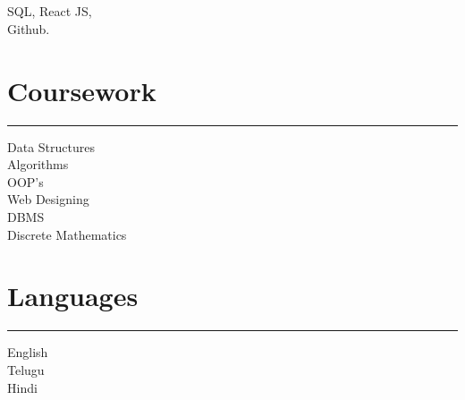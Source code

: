 \documentclass[]{rahulworld-resume}
\begin{document}
\begin{minipage}[t]{0.33\textwidth}
\subsection{}
\vspace{3pt}
SQL, React JS,\\
 Github.\\
\vspace{6pt}

\sectionsep
\section{Coursework}
\noindent\rule{5cm}{0.4pt}

Data Structures\\
Algorithms\\
OOP's\\
Web Designing\\
DBMS\\
Discrete Mathematics\\
\vspace{6pt}

\sectionsep

\section{Languages}
\noindent\rule{5cm}{0.4pt}

English \\
Telugu \\
Hindi 
\sectionsep

%
%

\end{minipage} 
\hfill
\end{document}
